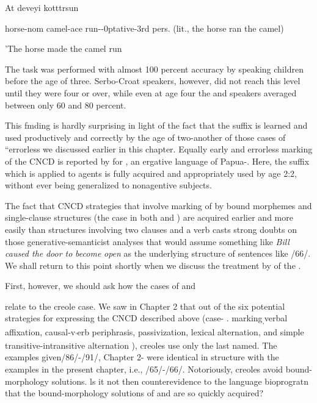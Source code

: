 \ea\label{ex:76}
 At deveyi kotttrsun
\glt
\z

horse-nom camel-ace run--0ptative-3rd pers. (lit., the horse ran the camel)

'The horse made the camel run

The task was performed with almost 100 percent accuracy by \-speaking children before the age of three. Serbo-Croat speakers, how\-ever, did not reach this level until they were four or over, while even at age four the  and  speakers averaged between only 60 and 80 percent.

This fmding is hardly surprising in light of the fact that the   suffix is learned and used productively and correctly by the age of two{}-another of those cases of ``errorless  we discussed earlier in this chapter. Equally early and errorless marking of the CNCD is reported by \citet{Schiefflin1979} for , an ergative language of Papua-. Here, the suffix which is applied to  agents is fully acquired and appropriately used by age 2:2, withont ever being generalized to nonagentive subjects.

The fact that CNCD strategies that involve marking of  by bound morphemes and single-clause structures (the case in both  and ) are acquired earlier and more easily than struc\-tures involving two clauses and a  verb casts strong doubts on those generative-semanticist analyses that would assume something like \textit{Bill} \textit{caused the} \textit{door to} \textit{become} \textit{open} as the underlying structure of sentences like /66/. We shall return to this point shortly when we discuss the treatment by \citet{Bowerman1974} of the   .

First, however, we should ask how the cases of  and

 relate to the creole case. We saw in Chapter 2 that out of the six potential strategies for expressing the CNCD described above (case- . marking\textsubscript{,}verbal affixation, causal{}-v\textsubscript{'}erb periphrasis, passivization, lexical
alternation, and simple transitive-intransitive alternation ), creoles use only the last named. The examples given/86/-/91/, Chapter 2- were identical in structure with the  examples in the present chapter, i.e., /65/-/66/. Notoriously, creoles avoid bound-morphology solutions. ls it not then counterevidence to the language bioprogratn that the bound-morphology solutions of  and  are so quickly acquired?

